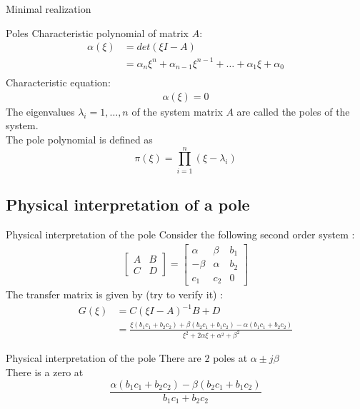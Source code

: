 \begin{subsection}{Minimal realization}
\begin{frame}{Poles}
Characteristic polynomial of matrix $A$:
\begin{align*}
\alpha(\xi)&=det(\xi I-A)\\
&=\alpha_n\xi^n+\alpha_{n-1}\xi^{n-1}+\hdots+\alpha_1\xi+\alpha_0\\
\end{align*}
\vspace{-0.4cm}
Characteristic equation:
\begin{align*}
\alpha(\xi)=0
\end{align*}
The eigenvalues $\lambda_i=1,\hdots,n$ of the system matrix $A$
are called the poles of the system.\\
The pole polynomial is defined as
$$\pi(\xi)=\prod\limits_{i=1}^n (\xi-\lambda_i)$$
\end{frame}

\subsection{Physical interpretation of a pole}
\begin{frame}{Physical interpretation of the pole}
Consider the following second order system :
\begin{align*}
{
\left[
    \begin{array}{c|c}
        A & B \\ \hline
        C & D
    \end{array}
\right]
=
\left[
\begin{array}{cc|c}
\alpha & \beta &b_1 \\ 
-\beta & \alpha &b_2 \\ \hline
c_1 &  c_2  & 0
\end{array}\right]
}
\end{align*}
The transfer matrix is given by (try to verify it) :
\begin{align*}
G(\xi) &=C(\xi I-A)^{-1}B+D\\
&=\frac{\xi(b_1c_1+b_2c_2)+\beta(b_2c_1+b_1c_2)-\alpha(b_1c_1+b_2c_2)}{\xi^2+2\alpha\xi+\alpha^2+\beta^2}
\end{align*}
\end{frame}

\begin{frame}{Physical interpretation of the pole}
\vspace{0.8cm}
There are $2$ poles at $\alpha\pm j\beta$\\
\vspace{0.8cm}
There is a zero at
$$\frac{\alpha(b_1c_1+b_2c_2)-\beta(b_2c_1+b_1c_2)}{b_1c_1+b_2c_2}$$
\end{frame}


\end{subsection}
